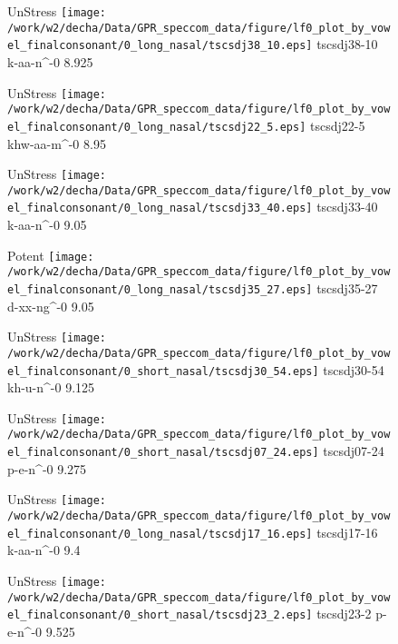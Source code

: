 \documentclass{article}
\begin{document}
\begin{figure}[t]
\begin{minipage}[b]{.24\textwidth}
UnStress
\centering
\texttt{[image: /work/w2/decha/Data/GPR\_speccom\_data/figure/lf0\_plot\_by\_vowel\_finalconsonant/0\_long\_nasal/tscsdj38\_10.eps]}
tscsdj38-10 k-aa-n\textasciicircum-0 8.925
\end{minipage}
\begin{minipage}[b]{.24\textwidth}
UnStress
\centering
\texttt{[image: /work/w2/decha/Data/GPR\_speccom\_data/figure/lf0\_plot\_by\_vowel\_finalconsonant/0\_long\_nasal/tscsdj22\_5.eps]}
tscsdj22-5 khw-aa-m\textasciicircum-0 8.95
\end{minipage}
\begin{minipage}[b]{.24\textwidth}
UnStress
\centering
\texttt{[image: /work/w2/decha/Data/GPR\_speccom\_data/figure/lf0\_plot\_by\_vowel\_finalconsonant/0\_long\_nasal/tscsdj33\_40.eps]}
tscsdj33-40 k-aa-n\textasciicircum-0 9.05
\end{minipage}
\begin{minipage}[b]{.24\textwidth}
\colorbox{Apricot}{Potent}
\centering
\texttt{[image: /work/w2/decha/Data/GPR\_speccom\_data/figure/lf0\_plot\_by\_vowel\_finalconsonant/0\_long\_nasal/tscsdj35\_27.eps]}
tscsdj35-27 d-xx-ng\textasciicircum-0 9.05
\end{minipage}
\end{figure}

\begin{figure}[t]
\begin{minipage}[b]{.24\textwidth}
UnStress
\centering
\texttt{[image: /work/w2/decha/Data/GPR\_speccom\_data/figure/lf0\_plot\_by\_vowel\_finalconsonant/0\_short\_nasal/tscsdj30\_54.eps]}
tscsdj30-54 kh-u-n\textasciicircum-0 9.125
\end{minipage}
\begin{minipage}[b]{.24\textwidth}
UnStress
\centering
\texttt{[image: /work/w2/decha/Data/GPR\_speccom\_data/figure/lf0\_plot\_by\_vowel\_finalconsonant/0\_short\_nasal/tscsdj07\_24.eps]}
tscsdj07-24 p-e-n\textasciicircum-0 9.275
\end{minipage}
\begin{minipage}[b]{.24\textwidth}
UnStress
\centering
\texttt{[image: /work/w2/decha/Data/GPR\_speccom\_data/figure/lf0\_plot\_by\_vowel\_finalconsonant/0\_long\_nasal/tscsdj17\_16.eps]}
tscsdj17-16 k-aa-n\textasciicircum-0 9.4
\end{minipage}
\begin{minipage}[b]{.24\textwidth}
UnStress
\centering
\texttt{[image: /work/w2/decha/Data/GPR\_speccom\_data/figure/lf0\_plot\_by\_vowel\_finalconsonant/0\_short\_nasal/tscsdj23\_2.eps]}
tscsdj23-2 p-e-n\textasciicircum-0 9.525
\end{minipage}
\end{figure}
\end{document}
